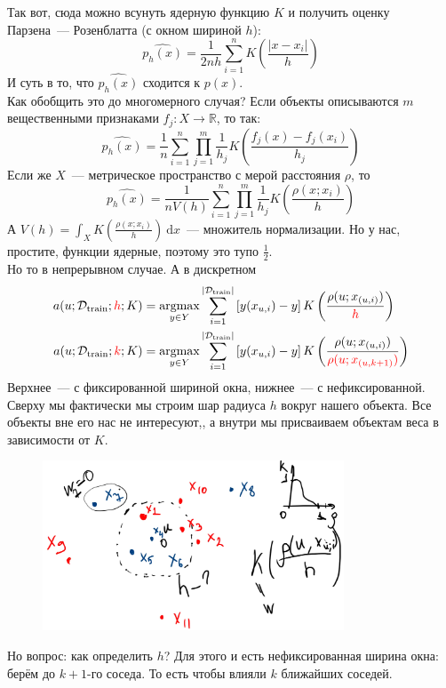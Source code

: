 \documentclass{article}
\begin{document}
    Так вот, сюда можно всунуть ядерную функцию $K$ и получить оценку Парзена~--- Розенблатта (с окном шириной $h$):
    \[
    \widehat{p_h(x)}=\frac1{2nh}\sum\limits_{i=1}^nK\left(\frac{|x-x_i|}h\right)
    \]
    И суть в то, что $\widehat{p_h(x)}$ сходится к $p(x)$.\\
    Как обобщить это до многомерного случая? Если объекты описываются $m$ вещественными признаками $f_j\colon X\to\mathbb R$, то так:
    \[
    \widehat{p_h(x)}=\frac1n\sum\limits_{i=1}^n\prod\limits_{j=1}^m\frac1{h_j}K\left(\frac{f_j(x)-f_j(x_i)}{h_j}\right)
    \]
    Если же $X$~--- метрическое пространство с мерой расстояния $\rho$, то
    \[
    \widehat{p_h(x)}=\frac1{nV(h)}\sum\limits_{i=1}^n\prod\limits_{j=1}^m\frac1{h_j}K\left(\frac{\rho(x;x_i)}h\right)
    \]
    А $V(h)=\int_XK\left(\frac{\rho(x;x_i)}h\right)~\mathrm dx$~--- множитель нормализации. Но у нас, простите, функции ядерные, поэтому это тупо $\frac12$.\\
    Но то в непрерывном случае. А в дискретном
    \[
    \begin{aligned}
        a(u;{\mathcal{D}}_{\mathrm{train}};{\color{red}h};K)&=\operatorname*{argmax}_{y\in Y}\sum\limits_{i=1}^{|{\mathcal{D}}_{\mathrm{train}}|}\left[y(x_{u,i})-y\right]K\left(\frac{\rho(u;x_{(u,i)})}{\color{red}h}\right)\\
        a(u;{\mathcal{D}}_{\mathrm{train}};{\color{red}k};K)&=\operatorname*{argmax}_{y\in Y}\sum\limits_{i=1}^{|{\mathcal{D}}_{\mathrm{train}}|}\left[y(x_{u,i})-y\right]K\left(\frac{\rho(u;x_{(u,i)})}{\color{red}\rho(u;x_{(u,k+1)})}\right)
    \end{aligned}
    \]
    Верхнее~--- с фиксированной шириной окна, нижнее~--- с нефиксированной.\\
    Сверху мы фактически мы строим шар радиуса $h$ вокруг нашего объекта. Все объекты вне его нас не интересуют,, а внутри мы присваиваем объектам веса в зависимости от $K$.
    \begin{figure}[H]
        \includegraphics[width=0.8\textwidth]{Images/ml_knn-1}
    \end{figure}
    Но вопрос: как определить $h$? Для этого и есть нефиксированная ширина окна: берём до $k+1$-го соседа. То есть чтобы влияли $k$ ближайших соседей.
\end{document}
